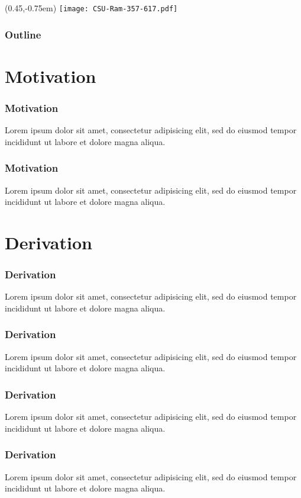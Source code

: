 \documentclass[xcolor=dvipsnames,10pt]{beamer}
\title{\TT}
\subtitle{}
\author{Aidan Winblad}
\institute{Colorado State University}
\date{\today}
\newcommand{\MO}{Motivation}
\newcommand{\DE}{Derivation}
\begin{document}
  \begin{frame}
    \begin{textblock*}{100mm}(0.45\textwidth,-0.75em)
      \texttt{[image: CSU-Ram-357-617.pdf]}
    \end{textblock*}
  \titlepage
  \end{frame}

  \begin{frame}
  \frametitle{Outline}
  \tableofcontents
  \end{frame}

  \section{\MO}
  \begin{frame}
    \frametitle{\MO}
    Lorem ipsum dolor sit amet, consectetur adipisicing elit, sed do eiusmod tempor incididunt ut labore et dolore magna aliqua.
  \end{frame}

  \begin{frame}
    \frametitle{\MO}
    Lorem ipsum dolor sit amet, consectetur adipisicing elit, sed do eiusmod tempor incididunt ut labore et dolore magna aliqua.
  \end{frame}

  \section{\DE}
  \begin{frame}
    \frametitle{\DE}
    Lorem ipsum dolor sit amet, consectetur adipisicing elit, sed do eiusmod tempor incididunt ut labore et dolore magna aliqua.
  \end{frame}

  \begin{frame}
    \frametitle{\DE}
    Lorem ipsum dolor sit amet, consectetur adipisicing elit, sed do eiusmod tempor incididunt ut labore et dolore magna aliqua.
  \end{frame}

  \begin{frame}
    \frametitle{\DE}
    Lorem ipsum dolor sit amet, consectetur adipisicing elit, sed do eiusmod tempor incididunt ut labore et dolore magna aliqua.
  \end{frame}

  \begin{frame}
    \frametitle{\DE}
    Lorem ipsum dolor sit amet, consectetur adipisicing elit, sed do eiusmod tempor incididunt ut labore et dolore magna aliqua.
  \end{frame}
\end{document}
